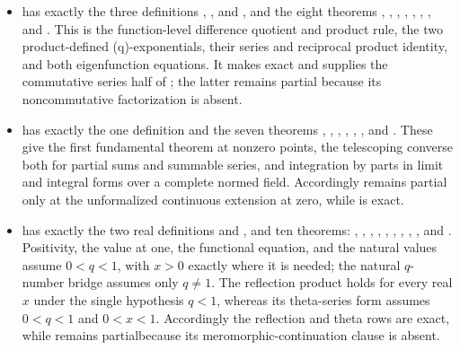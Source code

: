 \documentclass[11pt,a4paper,oneside,openany]{book}
\theoremstyle{definition}
\theoremstyle{remark}
\newcommand{\statusexact}{\textsf{\color{statusgreen}exact}}
\newcommand{\statuspartial}{\textsf{\color{statusamber}partial}}
\begin{document}
\begin{itemize}
\item {} has exactly the three definitions
, , and
, and the eight theorems
,
,
,
,
,
,
, and
.  This is the function-level difference
quotient and product rule, the two product-defined (q)-exponentials, their
series and reciprocal product identity, and both eigenfunction equations.
It makes  exact and supplies the commutative series half
of ; the latter remains partial because its
noncommutative factorization is absent.

\item {} has exactly the one definition
 and the seven theorems
,
,
,
,
,
, and
.  These give the first fundamental
theorem at nonzero points, the telescoping converse both for partial sums and
summable series, and integration by parts in limit and integral forms over a
complete normed field.  Accordingly  remains partial
only at the unformalized continuous extension at zero, while
 is exact.

\item {} has exactly the two real definitions
 and , and ten theorems:
,
,
,
,
,
,
,
,
, and
.  Positivity, the value at one,
the functional equation, and the natural values assume \(0<q<1\), with
\(x>0\) exactly where it is needed; the natural \(q\)-number bridge assumes
only \(q\ne1\).  The reflection product holds for every real \(x\) under the
single hypothesis \(q<1\), whereas its theta-series form assumes
\(0<q<1\) and \(0<x<1\).  Accordingly the reflection and theta rows are
\statusexact, while  remains \statuspartial because
its meromorphic-continuation clause is absent.


\end{itemize}
\end{document}
